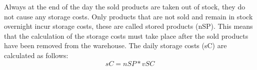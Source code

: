 Always at the end of the day the sold products are taken out of stock, they do not cause any storage costs. Only products that are not sold and remain in stock overnight incur storage costs, these are called stored products (\gls{nSP}). This means that the calculation of the storage costs must take place after the sold products have been removed from the warehouse. The daily storage costs (\gls{sC}) are calculated as follows:
\begin{equation}
    sC = nSP * vSC
\end{equation}